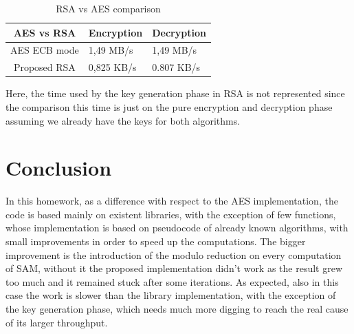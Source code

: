 \documentclass{article}
\begin{document}
\begin{table}[h]
	\begin{center}
		\begin{tabular}{ | c || m{2cm} | m{2cm} | }
			\hline
			AES vs RSA & Encryption & Decryption \\ [0.5ex] 
			\hline\hline
			AES ECB mode & 1,49 MB/s & 1,49 MB/s  \\ 
			\hline
			Proposed RSA & 0,825 KB/s & 0.807 KB/s \\ 
			\hline
		\end{tabular}
		\caption{RSA vs AES comparison}
		\label{tab:AES}
	\end{center}
\end{table}

Here, the time used by the key generation phase in RSA is not represented since the comparison this time is just on the pure encryption and decryption phase assuming we already have the keys for both algorithms.


\section{Conclusion}

In this homework, as a difference with respect to the AES implementation, the code is based mainly on existent libraries, with the exception of few functions, whose implementation is based on pseudocode of already known algorithms, with small improvements in order to speed up the computations. The bigger improvement is the introduction of the modulo reduction on every computation of SAM, without it the proposed implementation didn't work as the result grew too much and it remained stuck after some iterations. As expected, also in this case the work is slower than the library implementation, with the exception of the key generation phase, which needs much more digging to reach the real cause of its larger throughput.






\end{document}
